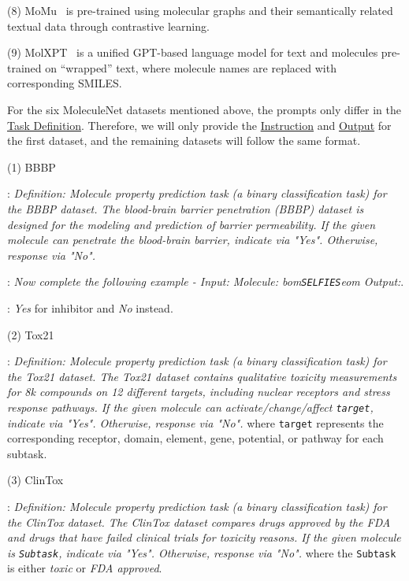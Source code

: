 \documentclass[11pt]{article}
\newcommand{\bom}{bom}
\newcommand{\eom}{eom}
\newcommand{\selfies}{\texttt{SELFIES}}
\begin{document}
\noindent(8) MoMu~\citep{su2022molecular} is pre-trained using molecular graphs and their semantically related textual data through contrastive learning.

\noindent(9) MolXPT~\cite{liu2023molxpt} is a unified GPT-based language model for text and molecules pre-trained on ``wrapped'' text, where molecule names are replaced with corresponding SMILES.


\noindent For the six MoleculeNet datasets mentioned above, the prompts only differ in the \underline{Task Definition}. Therefore, we will only provide the \underline{Instruction} and \underline{Output} for the first dataset, and the remaining datasets will follow the same format.

\noindent(1) BBBP

:
\textit{Definition: Molecule property prediction task (a binary classification task) for the BBBP dataset. The blood-brain barrier penetration (BBBP) dataset is designed for the modeling and prediction of barrier permeability. If the given molecule can penetrate the blood-brain barrier, indicate via "Yes". Otherwise, response via "No".} 

:
\textit{Now complete the following example - Input: Molecule: \bom{}\selfies{}\eom{} Output:}.

: \textit{Yes} for inhibitor and \textit{No} instead.

\noindent(2) Tox21

:
\textit{Definition: Molecule property prediction task (a binary classification task) for the Tox21 dataset. The Tox21 dataset contains qualitative toxicity measurements for 8k compounds on 12 different targets, including nuclear receptors and stress response pathways. If the given molecule can activate/change/affect \texttt{target}, indicate via "Yes". Otherwise, response via "No".} where \texttt{target} represents the corresponding receptor, domain, element, gene, potential, or pathway for each subtask.

\noindent(3) ClinTox

:
\textit{Definition: Molecule property prediction task (a binary classification task) for the ClinTox dataset. The ClinTox dataset compares drugs approved by the FDA and drugs that have failed clinical trials for toxicity reasons. If the given molecule is \texttt{Subtask}, indicate via "Yes". Otherwise, response via "No".} where the \texttt{Subtask} is either \textit{toxic} or \textit{FDA approved}.
\end{document}
